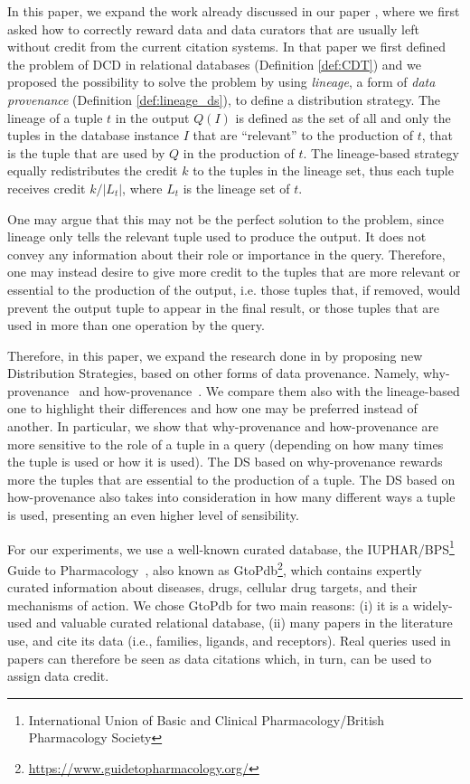 In this paper, we expand the work already discussed in our paper \citep{dosso2020data}, where we first asked how to correctly reward data and data curators that are usually left without credit from the current citation systems.
In that paper we first defined the problem of DCD in relational databases (Definition \ref{def:CDT}) and we proposed the possibility to solve the problem by using \emph{lineage}, a form of \emph{data provenance} (Definition \ref{def:lineage_ds}), to define a distribution strategy.
The lineage of a tuple $t$ in the output $Q(I)$ is defined as the set of all and only the tuples in the database instance $I$ that are ``relevant'' to the production of $t$, that is the tuple that are used by $Q$ in the production of $t$. 
The lineage-based strategy equally redistributes the credit $k$ to the tuples in the lineage set, thus each tuple receives credit $k/|L_t|$, where $L_t$ is the lineage set of $t$. 

One may argue that this may not be the perfect solution to the problem, since lineage only tells the relevant tuple used to produce the output. It does not convey any information about their role or importance in the query.
Therefore, one may instead desire to give more credit to the tuples that are more relevant or essential to the production of the output, i.e. those tuples that, if removed, would prevent the output tuple to appear in the final result, or those tuples that are used in more than one operation by the query. 

Therefore, in this paper, we expand the research done in \citep{dosso2020data} by proposing new Distribution Strategies, based on other forms of data provenance. 
Namely, why-provenance~\citep{WhyProvBuneman} and how-provenance~\cite{howProvenanceGreen}. 
We compare them also with the lineage-based one to highlight their differences and how one may be preferred instead of another. 
In particular, we show that why-provenance and how-provenance are more sensitive to the role of a tuple in a query (depending on how many times the tuple is used or how it is used). 
The DS based on why-provenance rewards more the tuples that are essential to the production of a tuple.
The DS based on how-provenance also takes into consideration in how many different ways a tuple is used, presenting an even higher level of sensibility. 

For our experiments, we use a well-known curated database, the IUPHAR/BPS\footnote{International Union of Basic and Clinical Pharmacology/British Pharmacology Society} Guide to Pharmacology~\citep{iuphar2018}, also known as GtoPdb\footnote{\url{https://www.guidetopharmacology.org/}}, which contains expertly curated information about diseases, drugs, cellular drug targets, and their mechanisms of action.
We chose GtoPdb for two main reasons: (i) it is a widely-used and valuable curated relational database, (ii) many papers in the literature use, and cite its data (i.e., families, ligands, and receptors). 
Real queries used in papers can therefore be seen as data citations which, in turn, can be used to assign data credit.

